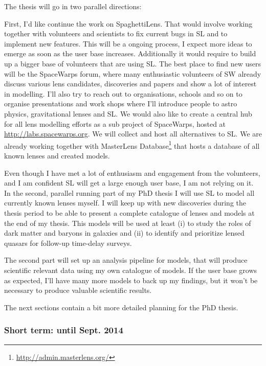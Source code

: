 \documentclass[11pt]{article}
\begin{document}
The thesis will go in two parallel directions:

First, I'd like continue the work on SpaghettiLens.
That would involve working together with volunteers and scientists to fix current bugs in SL and to implement new features.
This will be a ongoing process, I expect more ideas to emerge as soon as the user base increases.
Additionally it would require to build up a bigger base of volunteers that are using SL.
The best place to find new users will be the SpaceWarps forum, where many enthusiastic volunteers of SW already discuss various lens candidates, discoveries and papers and show a lot of interest in modelling.
I'll also try to reach out to organisations, schools and so on to organise presentations and work shops where I'll introduce people to astro physics, gravitational lenses and SL.
We would also like to create a central hub for all lens modelling efforts as a sub project of SpaceWarps, hosted at \url{http://labs.spacewarps.org}.
We will collect and host all alternatives to SL.
We are already working together with MasterLens Database\footnote{\url{http://admin.masterlens.org/}} that hosts a database of all known lenses and created models.


Even though I have met a lot of enthusiasm and engagement from the volunteers, and I am confident SL will get a large enough user base, I am not relying on it.
In the second, parallel running part of my PhD thesis I will use SL to model all currently known lenses myself.
I will keep up with new discoveries during the thesis period to be able to present a complete catalogue of lenses and models at the end of my thesis.
This models will be used at least (i) to study the roles of dark matter and baryons in galaxies and (ii) to identify and prioritize lensed quasars for follow-up time-delay surveys.

The second part will set up an analysis pipeline for models, that will produce scientific relevant data using my own catalogue of models.
If the user base grows as expected, I'll have many more models to back up my findings, but it won't be necessary to produce valuable scientific results.


The next sections contain a bit more detailed planning for the PhD thesis.

\subsubsection{Short term: until Sept. 2014} \label{sec:plan_short}
\end{document}
